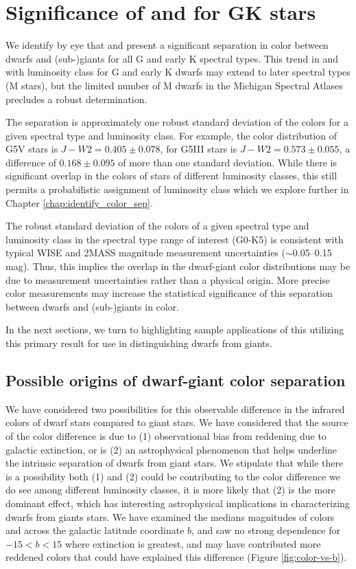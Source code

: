 \chapter{Significance of \jwone and \jwtwo for GK stars}\label{chap:3}

We identify by eye that \jwone and \jwtwo present a significant separation in color between dwarfs and (sub-)giants for all G and early K spectral types. This trend in \jwone and \jwtwo with luminosity class for G and early K dwarfs may extend to later spectral types (M stars), but the limited number of M dwarfs in the Michigan Spectral Atlases precludes a robust determination.

The separation is approximately one robust standard deviation of the colors for a given spectral type and luminosity class. For example, the color distribution of G5V stars is $J-W2=0.405\pm0.078$, for G5III stars is $J-W2=0.573\pm0.055$, a difference of $0.168\pm0.095$ of more than one standard deviation. While there is significant overlap in the colors of stars of different luminosity classes, this still permits a probabilistic assignment of luminosity class which we explore further in Chapter \ref{chap:identify_color_sep}.

The robust standard deviation of the colors of a given spectral type and luminosity class in the spectral type range of interest (G0-K5) is consistent with typical WISE and 2MASS magnitude measurement uncertainties ($\sim$0.05--0.15 mag). Thus, this implies the overlap in the dwarf-giant color distributions may be due to measurement uncertainties rather than a physical origin.  More precise color measurements may increase the statistical significance of this separation between dwarfs and (sub-)giants in color.

In the next sections, we turn to highlighting sample applications of this utilizing this primary result for use in distinguishing dwarfs from giants.

\section{Possible origins of dwarf-giant color separation}

We have considered two possibilities for this observable difference in the infrared colors of dwarf stars compared to giant stars. We have considered that the source of the color difference is due to (1) observational bias from reddening due to galactic extinction, or is (2) an astrophysical phenomenon that helps underline the intrinsic separation of dwarfs from giant stars. We stipulate that while there is a possibility both (1) and (2) could be contributing to the color difference we do see among different luminosity classes, it is more likely that (2) is the more dominant effect, which has interesting astrophysical implications in characterizing dwarfs from giants stars. We have examined the medians magnitudes of colors \jwone and \jwtwo across the galactic latitude coordinate $b$, and saw no strong dependence for $-15<b<15$ where extinction is greatest, and may have contributed more reddened colors that could have explained this difference (Figure \ref{fig:color-vs-b}).

